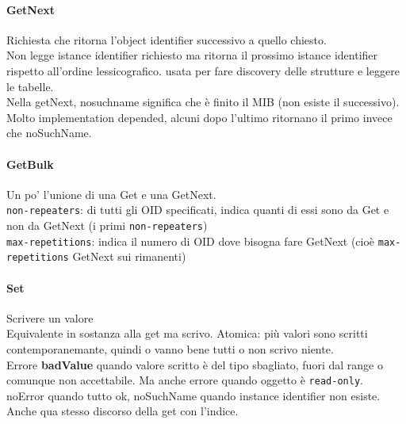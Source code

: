 \documentclass[10pt]{book}
\begin{document}
\paragraph{GetNext} Richiesta che ritorna l'object identifier successivo a quello chiesto.\\
Non legge istance identifier richiesto ma ritorna il prossimo istance identifier rispetto all'ordine lessicografico. usata per fare discovery delle strutture e leggere le tabelle.\\Nella getNext, nosuchname significa che è finito il MIB (non esiste il successivo). Molto implementation depended, alcuni dopo l'ultimo ritornano il primo invece che noSuchName.
\paragraph{GetBulk} Un po' l'unione di una Get e una GetNext.\\
\texttt{non-repeaters}: di tutti gli OID specificati, indica quanti di essi sono da Get e non da GetNext (i primi \texttt{non-repeaters})\\
\texttt{max-repetitions}: indica il numero di OID dove bisogna fare GetNext (cioè \texttt{max-repetitions} GetNext sui rimanenti)

\paragraph{Set} Scrivere un valore\\
Equivalente in sostanza alla get ma scrivo. Atomica: più valori sono scritti contemporanemante, quindi o vanno bene tutti o non scrivo niente.\\
Errore \textbf{badValue} quando valore scritto è del tipo sbagliato, fuori dal range o comunque non accettabile. Ma anche errore quando oggetto è \texttt{read-only}.\\
noError quando tutto ok, noSuchName quando instance identifier non esiste. Anche qua stesso discorso della get con l'indice.
\end{document}
